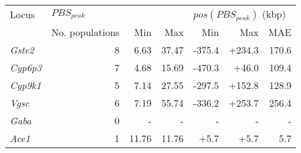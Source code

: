 \begin{tabular}{lrrrrrr}
\toprule
           Locus & \multicolumn{3}{l}{$PBS_{peak}$} & \multicolumn{3}{l}{$pos(PBS_{peak})$ (kbp)} \\
                 & No. populations &   Min &   Max &                     Min &    Max &   MAE \\
\midrule
  \textit{Gste2} &               8 &  6.63 & 37.47 &                  -375.4 & +234.3 & 170.6 \\
 \textit{Cyp6p3} &               7 &  4.68 & 15.69 &                  -470.3 &  +46.0 & 109.4 \\
 \textit{Cyp9k1} &               5 &  7.14 & 27.55 &                  -297.5 & +152.8 & 128.9 \\
   \textit{Vgsc} &               6 &  7.19 & 55.74 &                  -336.2 & +253.7 & 256.4 \\
   \textit{Gaba} &               0 &     - &     - &                       - &      - &     - \\
   \textit{Ace1} &               1 & 11.76 & 11.76 &                    +5.7 &   +5.7 &   5.7 \\
\bottomrule
\end{tabular}
